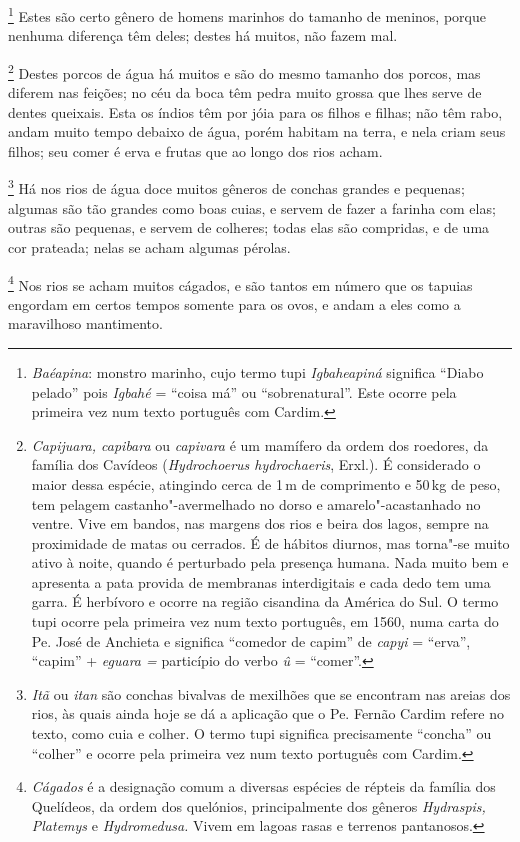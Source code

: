 \footnote{ \textit{Baéapina}: monstro marinho, cujo
termo tupi \textit{Igbaheapiná} significa ``Diabo pelado'' pois
\textit{Igbahé} = ``coisa má'' ou ``sobrenatural''. Este ocorre pela
primeira vez num texto português com Cardim.} Estes são
certo gênero de homens marinhos do tamanho de meninos, porque nenhuma
diferença têm deles; destes há muitos, não fazem mal.

\footnote{ \textit{Capijuara, capibara} ou
\textit{capivara} é um mamífero da ordem dos roedores, da família
dos Cavídeos (\textit{Hydrochoerus hydrochaeris}, Erxl.). É
considerado o maior dessa espécie, atingindo cerca de 1\,m de comprimento
e 50\,kg de peso, tem pelagem castanho"-avermelhado no dorso e
amarelo"-acastanhado no ventre. Vive em bandos, nas margens dos rios e
beira dos lagos, sempre na proximidade de matas ou cerrados. É de
hábitos diurnos, mas torna"-se muito ativo à noite, quando é perturbado
pela presença humana. Nada muito bem e apresenta a pata provida de
membranas interdigitais e cada dedo tem uma garra. É herbívoro e ocorre
na região cisandina da América do Sul. O termo tupi ocorre pela
primeira vez num texto português, em 1560, numa carta do Pe.
José de Anchieta e significa ``comedor de capim'' de \textit{capyi} = 
``erva'', ``capim'' + \textit{eguara =} particípio do verbo \textit{û} = 
``comer''.} Destes porcos de água há muitos e são do mesmo
tamanho dos porcos, mas diferem nas feições; no céu da boca têm pedra
muito grossa que lhes serve de dentes queixais. Esta os índios têm por
jóia para os filhos e filhas; não têm rabo, andam muito tempo debaixo
de água, porém habitam na terra, e nela criam seus filhos; seu comer é
erva e frutas que ao longo dos rios acham.

\footnote{ \textit{Itã} ou \textit{itan} são conchas
bivalvas de mexilhões que se encontram nas areias dos rios, às quais
ainda hoje se dá a aplicação que o Pe. Fernão Cardim refere no texto,
como cuia e colher. O termo tupi significa precisamente ``concha'' ou
``colher'' e ocorre pela primeira vez num texto português com
Cardim.} Há nos rios de água doce muitos gêneros de conchas
grandes e pequenas; algumas são tão grandes como boas cuias, e servem
de fazer a farinha com elas; outras são pequenas, e servem de colheres;
todas elas são compridas, e de uma cor prateada; nelas se acham algumas pérolas.

\footnote{ \textit{Cágados} é a designação comum a
diversas espécies de répteis da família dos Quelídeos, da ordem dos
quelónios, principalmente dos gêneros \textit{Hydraspis, Platemys} e 
\textit{Hydromedusa.} Vivem em lagoas rasas e terrenos pantanosos.}
 Nos rios se acham muitos cágados, e são tantos em número
que os tapuias engordam em certos tempos somente para os ovos, e andam
a eles como a maravilhoso mantimento.

